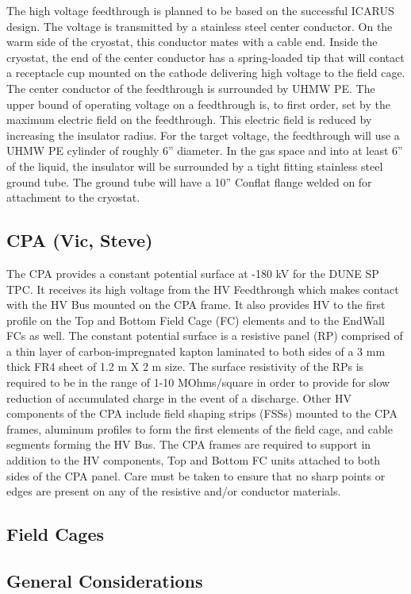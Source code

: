 The high voltage feedthrough is planned to be based on the successful ICARUS design.  The voltage is transmitted by a stainless steel center conductor.  On the warm side of the cryostat, this conductor mates with a cable end.  Inside the cryostat, the end of the center conductor has a spring-loaded tip that will contact a receptacle cup mounted on the cathode delivering high voltage to the field cage.  The center conductor of the feedthrough is surrounded by UHMW PE.  The upper bound of operating voltage on a feedthrough is, to first order, set by the maximum electric field on the feedthrough.  This electric field is reduced by increasing the insulator radius.  For the target voltage, the feedthrough will use a UHMW PE cylinder of roughly 6'' diameter.  In the gas space and into at least 6'' of the liquid, the insulator will be surrounded by a tight fitting stainless steel ground tube.  The ground tube will have a 10'' Conflat flange welded on for attachment to the cryostat.

\subsection{CPA (Vic, Steve)}
The CPA provides a constant potential surface at -180 kV for the DUNE SP TPC.  It receives its high voltage from the HV Feedthrough which makes contact with the HV Bus mounted on the CPA frame.  It also provides HV to the first profile on the Top and Bottom Field Cage (FC) elements and to the EndWall FCs as well.  The constant potential surface is a resistive panel (RP) comprised of a thin layer of carbon-impregnated kapton laminated to both sides of a 3 mm thick FR4 sheet of 1.2 m X 2 m size.  The surface resistivity of the RPs is required to be in the range of 1-10 MOhms/square in order to provide for slow reduction of accumulated charge in the event of a discharge.  Other HV components of the CPA include field shaping strips (FSSs) mounted to the CPA frames, aluminum profiles to form the first elements of the field cage, and cable segments forming the HV Bus.  The CPA frames are required to support in addition to the HV components, Top and Bottom FC units attached to both sides of the CPA panel.  Care must be taken to ensure that no sharp points or edges are present on any of the resistive and/or conductor materials.  
\subsection{Field Cages}

\subsection{General Considerations}

